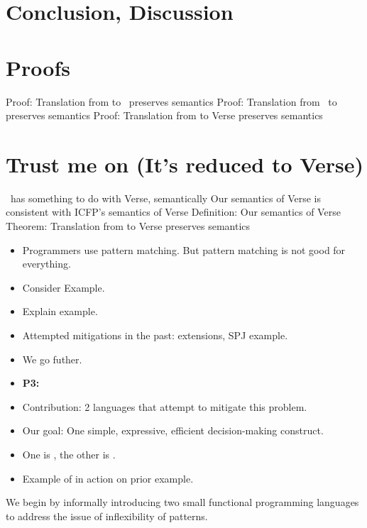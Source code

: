 \documentclass[manuscript,screen,review, 12pt]{acmart}
\begin{document}
\section{Conclusion, Discussion}

\renewcommand\thesection{\Alph{section}}
\setcounter{section}{0}
\section{Proofs}
\begin{outline}
    \1 Proof: Translation from \VMinus to \D\ preserves semantics 
    \1 Proof: Translation from \PPlus\ to \VMinus preserves semantics 
    \1 Proof: Translation from \VMinus to Verse preserves semantics     
\end{outline}

\section{Trust me on \VMinus (It's reduced to Verse)}
\begin{outline}
    \1 \VMinus\ has something to do with Verse, semantically 
    \1 Our semantics of Verse is consistent with ICFP's semantics of Verse 
    \1 Definition: Our semantics of Verse
    \1 Theorem: Translation from \VMinus to Verse preserves semantics     
\end{outline}

\begin{itemize}
    \item Programmers use pattern matching. But pattern matching is not good for
    everything. 
    \item Consider Example. 
    \item Explain example. 
    \item Attempted mitigations in the past: extensions, SPJ example. 
    \item We go futher. 
    \item \bf{P3}: 
    \item Contribution: 2 languages that attempt to mitigate this problem. 
    \item Our goal: One simple, expressive, efficient decision-making construct.
    \item One is {\PPlus}, the other is {\VMinus}. 
    \item Example of {\VMinus} in action on prior example. 
\end{itemize}

We begin by informally introducing two small functional programming languages to
address the issue of inflexibility of patterns.
\end{document}
